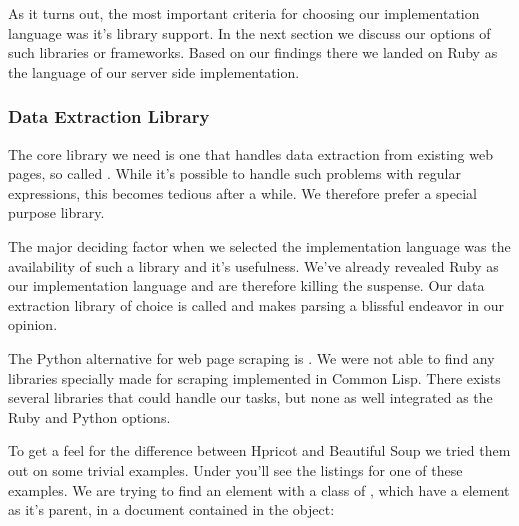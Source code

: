 As it turns out, the most important criteria for choosing our implementation
language was it's library support. In the next section we discuss our options
of such libraries or frameworks. Based on our findings there we landed on
Ruby as the language of our server side implementation.

\subsubsection{Data Extraction Library}

The core library we need is one that handles data extraction from existing
web pages, so called  . While it's possible to
handle such problems with regular expressions, this becomes tedious after a
while. We therefore prefer a special purpose library.

The major deciding factor when we selected the implementation language was
the availability of such a library and it's usefulness. We've already
revealed Ruby as our implementation language and are therefore killing the
suspense. Our data extraction library of choice is called %
and makes  parsing a blissful endeavor in our opinion.

The Python alternative for web page scraping is .
We were not able to find any libraries specially made for  scraping
implemented in Common Lisp. There exists several %
libraries that could handle our tasks, but none as well integrated as
the Ruby and Python options.

To get a feel for the difference between Hpricot and Beautiful Soup we tried
them out on some trivial examples. Under you'll see the listings for one
of these examples. We are trying to find an  element with a class
of , which have a  element as it's parent,
in a  document contained in the  object:

